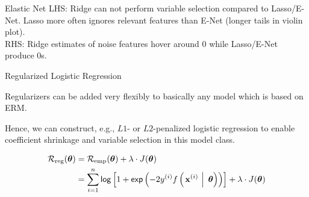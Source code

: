 \documentclass[11pt,compress,t,notes=noshow, xcolor=table]{beamer}
\begin{document}
\begin{vbframe} {Elastic Net }
\footnotesize
LHS: Ridge can not perform variable selection compared to Lasso/E-Net. Lasso more often ignores relevant features than E-Net (longer tails in violin plot).\\
RHS: Ridge estimates of noise features hover around $0$ while Lasso/E-Net produce $0$s.

\end{vbframe}



\begin{vbframe}{Regularized Logistic Regression}

Regularizers can be added very flexibly to basically any model which is based on ERM.

\lz 

Hence, we can construct, e.g., $L1$- or $L2$-penalized logistic regression to enable coefficient shrinkage and variable selection in this model class. 


\begin{align*}
\mathcal{R}_{\text{reg}}(\bm{\theta}) &= \mathcal{R}_{\text{emp}}(\bm{\theta}) + \lambda \cdot J(\bm{\theta}) \\
&= \sum\limits_{i=1}^n \mathsf{log}\left[1 + \mathsf{exp}\left(-2y^{(i)} f\left(\left.\mathbf{x}^{(i)}~\right|~ \bm{\theta}\right)\right)\right] + \lambda \cdot J(\bm{\theta})
\end{align*}


\end{vbframe}
\end{document}
